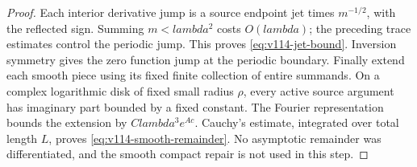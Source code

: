 \documentclass[11pt]{article}
\def\lambda{lambda}%
\theoremstyle{remark}
\begin{document}
\begin{proof}
Each interior derivative jump is a source endpoint jet times
$m^{-1/2}$, with the reflected sign. Summing $m<\lambda^2$ costs
$O(\lambda)$; the preceding trace estimates control the periodic jump.
This proves \eqref{eq:v114-jet-bound}. Inversion symmetry gives the zero
function jump at the periodic boundary.
Finally extend each smooth piece using its fixed finite collection of
entire summands. On a complex logarithmic disk of fixed small radius
$\rho$, every active source argument has imaginary part bounded by a
fixed constant. The Fourier representation bounds the extension by
$C\lambda^3e^{Ac}$. Cauchy's estimate, integrated over total length $L$,
proves \eqref{eq:v114-smooth-remainder}. No asymptotic remainder was
differentiated, and the smooth compact repair is not used in this step.
\end{proof}
\end{document}
